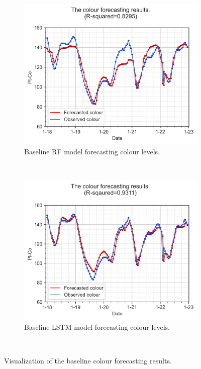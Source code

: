 \begin{figure}[!ht]
  \centering
    \begin{subfigure}[t]{0.75\textwidth}
      \includegraphics[width=\linewidth]{imgs/results/ammonia-colour-forecast-plot/00-RF_1_pred_Step1-obs-colour.png}
      \caption{Baseline RF model forecasting colour levels.} \label{fig:baseline-colour-plot-rf}
    \end{subfigure}\\ 
    \vspace{1em}%
    \begin{subfigure}[t]{0.75\textwidth}
      \includegraphics[width=\linewidth]{imgs/results/ammonia-colour-forecast-plot/00-LSTM_1_pred_Step1-obs-colour.png}
      \caption{Baseline LSTM model forecasting colour levels.} \label{fig:baseline-colour-plot-lstm}
    \end{subfigure}\\
  \caption{Visualization of the baseline colour forecasting results.} \label{fig:baseline-plot-colour}
\end{figure}

